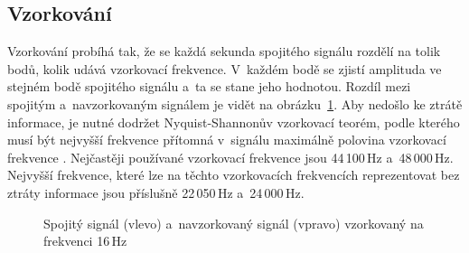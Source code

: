 \subsection*{Vzorkování}
\label{sub:sampling}

Vzorkování probíhá tak, že se každá sekunda spojitého signálu rozdělí na tolik
bodů, kolik udává vzorkovací frekvence. V~každém bodě se zjistí amplituda ve
stejném bodě spojitého signálu a~ta se stane jeho hodnotou. Rozdíl mezi
spojitým a~navzorkovaným signálem je vidět na
obrázku~\ref{pic:continuous-vs-sampled-signal}. Aby nedošlo ke ztrátě
informace, je nutné dodržet Nyquist-Shannonův vzorkovací teorém, podle kterého
musí být nejvyšší frekvence přítomná v~signálu maximálně polovina vzorkovací
frekvence \cite{Shannon1949}. Nejčastěji používané vzorkovací frekvence jsou
44\,100\,Hz a~48\,000\,Hz. Nejvyšší frekvence, které lze na těchto vzorkovacích
frekvencích reprezentovat bez ztráty informace jsou příslušně 22\,050\,Hz
a~24\,000\,Hz.


\begin{figure}[hbt]
    \centering
    \begin{subfigure}[b]{0.5\linewidth}
        \centering
    \end{subfigure}%
    \begin{subfigure}[b]{0.5\linewidth}
        \centering
    \end{subfigure}
    \caption{Spojitý signál (vlevo) a~navzorkovaný signál (vpravo) vzorkovaný
    na frekvenci 16\,Hz}
    \label{pic:continuous-vs-sampled-signal}
\end{figure}

